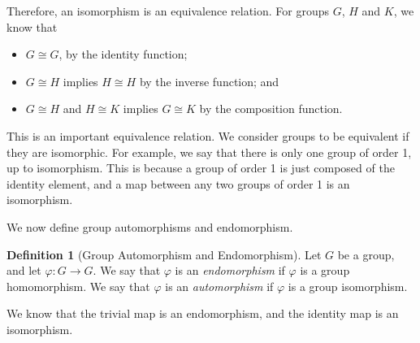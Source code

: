 \documentclass[a4paper, openany]{memoir}
\theoremstyle{definition}
\newtheorem{definition}{Definition}[section]
\theoremstyle{plain}
\begin{document}
\noindent Therefore, an isomorphism is an equivalence relation. For groups $G$, $H$ and $K$, we know that
\begin{itemize}
    \item $G \cong G$, by the identity function;
    \item $G \cong H$ implies $H \cong H$ by the inverse function; and
    \item $G \cong H$ and $H \cong K$ implies $G \cong K$ by the composition function.
\end{itemize}
This is an important equivalence relation. We consider groups to be equivalent if they are isomorphic. For example, we say that there is only one group of order 1, up to isomorphism. This is because a group of order 1 is just composed of the identity element, and a map between any two groups of order 1 is an isomorphism.

We now define group automorphisms and endomorphism.
\begin{definition}[Group Automorphism and Endomorphism]
Let $G$ be a group, and let $\varphi: G \to G$. We say that $\varphi$ is an \emph{endomorphism} if $\varphi$ is a group homomorphism. We say that $\varphi$ is an \emph{automorphism} if $\varphi$ is a group isomorphism.
\end{definition}
\noindent We know that the trivial map is an endomorphism, and the identity map is an isomorphism.
\end{document}
